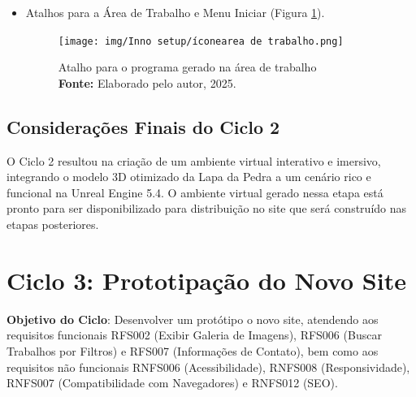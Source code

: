 \begin{itemize}
    \item Atalhos para a Área de Trabalho e Menu Iniciar (Figura \ref{fig:atalho_icone}). 
    \begin{figure}[H]
        \centering
        \texttt{[image: img/Inno setup/íconearea de trabalho.png]}
        \caption{Atalho para o programa gerado na área de trabalho \\
            \textbf{Fonte:} Elaborado pelo autor, 2025.}
        \label{fig:atalho_icone}
\end{figure}
    
\end{itemize}




\subsection*{Considerações Finais do Ciclo 2}
O Ciclo 2 resultou na criação de um ambiente virtual interativo e imersivo, integrando o modelo 3D otimizado da Lapa da Pedra a um cenário rico e funcional na Unreal Engine 5.4. O ambiente virtual gerado nessa etapa está pronto para ser disponibilizado para distribuição no site que será construído nas etapas posteriores.






\section{Ciclo 3: Prototipação do Novo Site}
\label{sec:ciclo3_site}

\textbf{Objetivo do Ciclo}: Desenvolver um protótipo o novo site, atendendo aos requisitos funcionais RFS002 (Exibir Galeria de Imagens), RFS006 (Buscar Trabalhos por Filtros) e RFS007 (Informações de Contato), bem como aos requisitos não funcionais RNFS006 (Acessibilidade), RNFS008 (Responsividade), RNFS007 (Compatibilidade com Navegadores) e RNFS012 (SEO).


